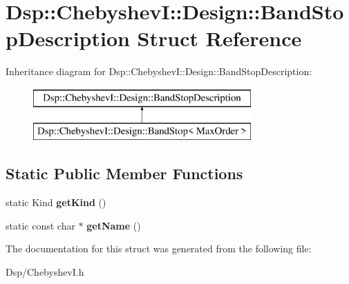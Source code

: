 \hypertarget{structDsp_1_1ChebyshevI_1_1Design_1_1BandStopDescription}{\section{Dsp\-:\-:Chebyshev\-I\-:\-:Design\-:\-:Band\-Stop\-Description Struct Reference}
\label{structDsp_1_1ChebyshevI_1_1Design_1_1BandStopDescription}
}
Inheritance diagram for Dsp\-:\-:Chebyshev\-I\-:\-:Design\-:\-:Band\-Stop\-Description\-:\begin{figure}[H]
\begin{center}
\leavevmode
\includegraphics[height=2.000000cm]{structDsp_1_1ChebyshevI_1_1Design_1_1BandStopDescription}
\end{center}
\end{figure}
\subsection*{Static Public Member Functions}
\begin{DoxyCompactItemize}
\item 
\hypertarget{structDsp_1_1ChebyshevI_1_1Design_1_1BandStopDescription_a57af5333e6b207150cd3cfcbee0259f3}{static Kind {\bfseries get\-Kind} ()}\label{structDsp_1_1ChebyshevI_1_1Design_1_1BandStopDescription_a57af5333e6b207150cd3cfcbee0259f3}

\item 
\hypertarget{structDsp_1_1ChebyshevI_1_1Design_1_1BandStopDescription_a8a4555de891844f20b330b487b587a88}{static const char $\ast$ {\bfseries get\-Name} ()}\label{structDsp_1_1ChebyshevI_1_1Design_1_1BandStopDescription_a8a4555de891844f20b330b487b587a88}

\end{DoxyCompactItemize}


The documentation for this struct was generated from the following file\-:\begin{DoxyCompactItemize}
\item 
Dsp/Chebyshev\-I.\-h\end{DoxyCompactItemize}

